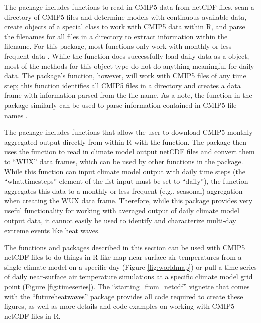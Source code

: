 The  package includes functions to read in CMIP5 data from
netCDF files, scan a directory of CMIP5 files and determine models with
continuous available data, create objects of a special 
class to work with CMIP5 data within R, and parse the filenames for all
files in a directory to extract information within the filename. For
this package, most functions only work with monthly or less frequent
data \citep{RCMIP5}. While the  function does
successfully load daily data as a  object, most of the
methods for this object type do not do anything meaningful for daily
data. The package's  function, however, will work with
CMIP5 files of any time step; this function identifies all CMIP5 files
in a directory and creates a data frame with information parsed from the
file name. As a note, the  function in
the  package similarly can be used to parse
information contained in CMIP5 file names \citep{ncdf4.helpers}.

The  package \citep{wux} includes functions that allow the user
to download CMIP5 monthly-aggregated output directly from within R with
the  function. The package then uses the
 function to read in climate model output netCDF files
and convert them to ``WUX'' data frames, which can be used by other
functions in the package. While this function can input climate model
output with daily time steps (the ``what.timesteps'' element of the
 list input must be set to ``daily''), the function
aggregates this data to a monthly or less frequent (e.g., seasonal)
aggregation when creating the WUX data frame. Therefore, while this
package provides very useful functionality for working with averaged
output of daily climate model output data, it cannot easily be used to
identify and characterize multi-day extreme events like heat waves.

The functions and packages described in this section can be used with
CMIP5 netCDF files to do things in R like map near-surface air
temperatures from a single climate model on a specific day (Figure
\ref{fig:worldmap}) or pull a time series of daily near-surface air
temperature simulations at a specific climate model grid point (Figure
\ref{fig:timeseries}). The ``starting\_from\_netcdf'' vignette that
comes with the ``futureheatwaves'' package provides all code required to
create these figures, as well as more details and code examples on
working with CMIP5 netCDF files in R.

